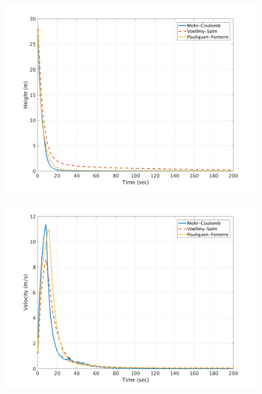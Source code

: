 \documentclass[a4paper,10pt]{article}
\begin{document}
\begin{figure}[H]
	\begin{minipage}[b]{0.5\linewidth}
	\centering
    \includegraphics[width=1\textwidth]{HeightMeans/H1All.png}     
        \label{fig:MFHR_L1}
	\end{minipage}
	\begin{minipage}[b]{0.5\linewidth}
	\centering
    \includegraphics[width=1\textwidth]{VelocityMeans/V1All.png}
        \label{fig:MFVR_L1}
	\end{minipage}
	

\end{figure}
\end{document}
